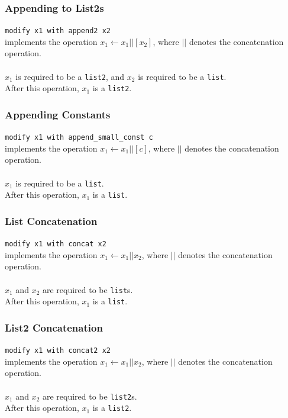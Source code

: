 \subsubsection{Appending to List2s}

\texttt{modify x1 with append2 x2} \\
implements the operation $x_1 \leftarrow x_1 || [x_2]$, where $||$ denotes the concatenation operation. \\ \\
$x_1$ is required to be a \texttt{list2}, and $x_2$ is required to be a \texttt{list}. \\
After this operation, $x_1$ is a \texttt{list2}.

\subsubsection{Appending Constants}

\texttt{modify x1 with append\_small\_const c} \\
implements the operation $x_1 \leftarrow x_1 || [c]$, where $||$ denotes the concatenation operation. \\ \\
$x_1$ is required to be a \texttt{list}. \\
After this operation, $x_1$ is a \texttt{list}.

\subsubsection{List Concatenation}

\texttt{modify x1 with concat x2} \\
implements the operation $x_1 \leftarrow x_1 || x_2$, where $||$ denotes the concatenation operation. \\ \\
$x_1$ and $x_2$ are required to be \texttt{list}s. \\
After this operation, $x_1$ is a \texttt{list}.

\subsubsection{List2 Concatenation}

\texttt{modify x1 with concat2 x2} \\
implements the operation $x_1 \leftarrow x_1 || x_2$, where $||$ denotes the concatenation operation. \\ \\
$x_1$ and $x_2$ are required to be \texttt{list2}s. \\
After this operation, $x_1$ is a \texttt{list2}.

